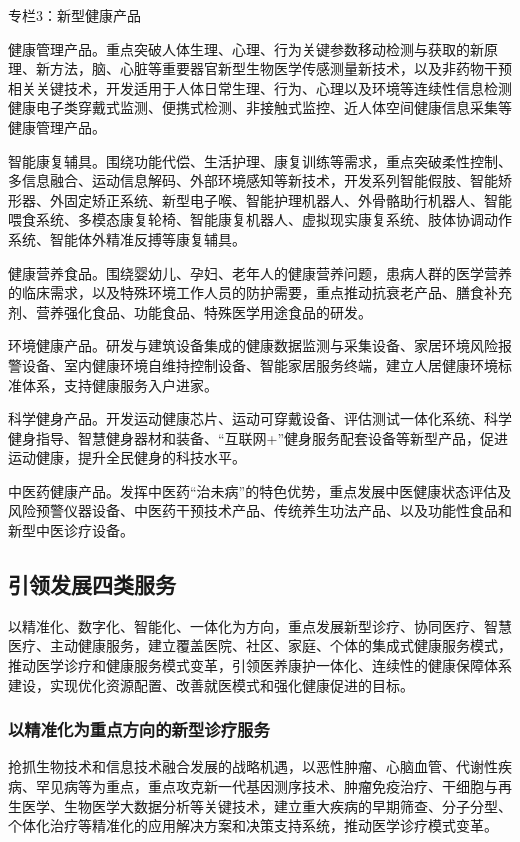\documentclass{article}
\begin{document}
\begin{minipage}{20em}
	专栏3：新型健康产品
	
	健康管理产品。重点突破人体生理、心理、行为关键参数移动检测与获取的新原理、新方法，脑、心脏等重要器官新型生物医学传感测量新技术，以及非药物干预相关关键技术，开发适用于人体日常生理、行为、心理以及环境等连续性信息检测健康电子类穿戴式监测、便携式检测、非接触式监控、近人体空间健康信息采集等健康管理产品。
	
	智能康复辅具。围绕功能代偿、生活护理、康复训练等需求，重点突破柔性控制、多信息融合、运动信息解码、外部环境感知等新技术，开发系列智能假肢、智能矫形器、外固定矫正系统、新型电子喉、智能护理机器人、外骨骼助行机器人、智能喂食系统、多模态康复轮椅、智能康复机器人、虚拟现实康复系统、肢体协调动作系统、智能体外精准反搏等康复辅具。
	
	健康营养食品。围绕婴幼儿、孕妇、老年人的健康营养问题，患病人群的医学营养的临床需求，以及特殊环境工作人员的防护需要，重点推动抗衰老产品、膳食补充剂、营养强化食品、功能食品、特殊医学用途食品的研发。
	
	环境健康产品。研发与建筑设备集成的健康数据监测与采集设备、家居环境风险报警设备、室内健康环境自维持控制设备、智能家居服务终端，建立人居健康环境标准体系，支持健康服务入户进家。
	
	科学健身产品。开发运动健康芯片、运动可穿戴设备、评估测试一体化系统、科学健身指导、智慧健身器材和装备、“互联网+”健身服务配套设备等新型产品，促进运动健康，提升全民健身的科技水平。
	
	中医药健康产品。发挥中医药“治未病”的特色优势，重点发展中医健康状态评估及风险预警仪器设备、中医药干预技术产品、传统养生功法产品、以及功能性食品和新型中医诊疗设备。
\end{minipage}


\subsection{引领发展四类服务}

以精准化、数字化、智能化、一体化为方向，重点发展新型诊疗、协同医疗、智慧医疗、主动健康服务，建立覆盖医院、社区、家庭、个体的集成式健康服务模式，推动医学诊疗和健康服务模式变革，引领医养康护一体化、连续性的健康保障体系建设，实现优化资源配置、改善就医模式和强化健康促进的目标。

\subsubsection{以精准化为重点方向的新型诊疗服务}

抢抓生物技术和信息技术融合发展的战略机遇，以恶性肿瘤、心脑血管、代谢性疾病、罕见病等为重点，重点攻克新一代基因测序技术、肿瘤免疫治疗、干细胞与再生医学、生物医学大数据分析等关键技术，建立重大疾病的早期筛查、分子分型、个体化治疗等精准化的应用解决方案和决策支持系统，推动医学诊疗模式变革。
\end{document}
